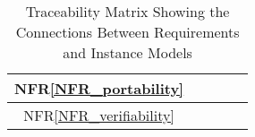 \documentclass[12pt]{article}
\newcommand{\nfrref}[1]{NFR\ref{#1}}
\begin{document}
\begin{table}[h!]
\begin{tabular}{|c|c|c|c|c|}
    \nfrref{NFR_portability}       &                &                 &                &                           \\ \hline %
    \nfrref{NFR_verifiability}     &                &                 &                &                           \\ \hline %
  \end{tabular}
  \caption{Traceability Matrix Showing the Connections Between Requirements and Instance Models}
  \label{Table:R_trace}
\end{table}





\end{document}
